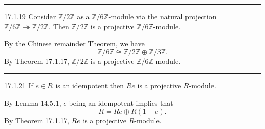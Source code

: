 \documentclass[a4paper, 12pt]{article}
\begin{document}
\noindent\rule{7in}{2.8pt}
\begin{problem}{17.1.19}
Consider \(\mathbb{Z}/2 \mathbb{Z}\) as a \(\mathbb{Z}/6 \mathbb{Z}\)-module via the natural projection \(\mathbb{Z}/6 \mathbb{Z}\twoheadrightarrow \mathbb{Z}/2 \mathbb{Z}\). 
Then \(\mathbb{Z}/2 \mathbb{Z}\) is a projective \(\mathbb{Z}/6 \mathbb{Z}\)-module.
\end{problem}
\begin{solution}
By the Chinese remainder Theorem, we have 
\[\mathbb{Z}/6 \mathbb{Z}\cong \mathbb{Z}/2 \mathbb{Z}\oplus \mathbb{Z}/3 \mathbb{Z}.\]
By Theorem 17.1.17, \(\mathbb{Z}/2 \mathbb{Z}\) is a projective \(\mathbb{Z}/6 \mathbb{Z}\)-module.
\end{solution}

\noindent\rule{7in}{2.8pt}
\begin{problem}{17.1.21}
If \(e\in R\) is an idempotent then \(Re\) is a projective \(R\)-module.
\end{problem}
\begin{solution}
By Lemma 14.5.1, \(e\) being an idempotent implies that 
\[R=Re\oplus R(1-e).\]
By Theorem 17.1.17, \(Re\) is a projective \(R\)-module.
\end{solution}
\end{document}
